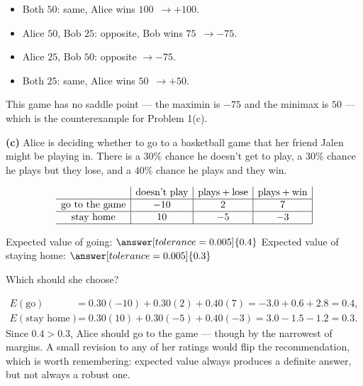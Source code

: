 \documentclass[12pt]{ximera}
\begin{document}
\begin{problem}
\begin{prompt}
\begin{feedback}
\begin{itemize}
\item Both $50$\textcent: same, Alice wins $100$\textcent\ $\to +100$.
\item Alice $50$\textcent, Bob $25$\textcent: opposite, Bob wins $75$\textcent\ $\to -75$.
\item Alice $25$\textcent, Bob $50$\textcent: opposite $\to -75$.
\item Both $25$\textcent: same, Alice wins $50$\textcent\ $\to +50$.
\end{itemize}
This game has no saddle point --- the maximin is $-75$ and the minimax is $50$ --- which
is the counterexample for Problem 1(c).
\end{feedback}
\end{prompt}

\begin{prompt}
\textbf{(c)} Alice is deciding whether to go to a basketball game that her friend Jalen
might be playing in. There is a $30\%$ chance he doesn't get to play, a $30\%$ chance he
plays but they lose, and a $40\%$ chance he plays and they win.

\[
\begin{array}{c|c|c|c|}
\phantom{|} & \text{doesn't play} & \text{plays}+\text{lose} & \text{plays}+\text{win} \\\hline
\text{go to the game} & -10 & 2 & 7 \\\hline
\text{stay home} & 10 & -5 & -3 \\\hline
\end{array}
\]

Expected value of going: $\answer[tolerance=0.005]{0.4}$ \qquad
Expected value of staying home: $\answer[tolerance=0.005]{0.3}$

\smallskip
Which should she choose?
\begin{multipleChoice}
\end{multipleChoice}

\begin{feedback}
\begin{align*}
E(\text{go}) &= 0.30(-10) + 0.30(2) + 0.40(7) = -3.0 + 0.6 + 2.8 = 0.4,\\
E(\text{stay home}) &= 0.30(10) + 0.30(-5) + 0.40(-3) = 3.0 - 1.5 - 1.2 = 0.3.
\end{align*}
Since $0.4 > 0.3$, Alice should go to the game --- though by the narrowest of margins.
A small revision to any of her ratings would flip the recommendation, which is worth
remembering: expected value always produces a definite answer, but not always a robust
one.
\end{feedback}
\end{prompt}
\end{problem}
\end{document}
